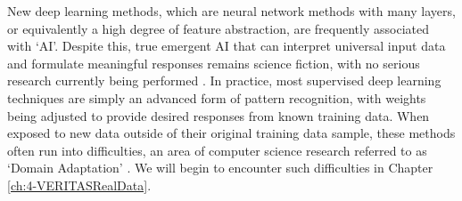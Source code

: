 New deep learning methods, which are neural network methods with many layers, or equivalently a high degree of feature abstraction, are frequently associated with `AI'. Despite this, true emergent AI that can interpret universal input data and formulate meaningful responses remains science fiction, with no serious research currently being performed \cite{emergent}. In practice, most supervised deep learning techniques are simply an advanced form of pattern recognition, with weights being adjusted to provide desired responses from known training data. When exposed to new data outside of their original training data sample, these methods often run into difficulties, an area of computer science research referred to as `Domain Adaptation' \cite{wilson}. We will begin to encounter such difficulties in Chapter \ref{ch:4-VERITASRealData}.

